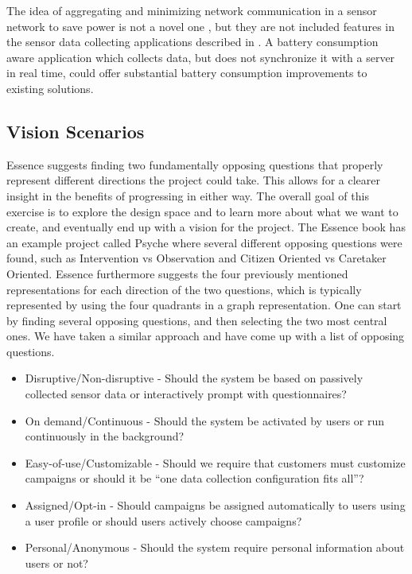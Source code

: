 The idea of aggregating and minimizing network communication in a sensor network to save power is not a novel one \parencite{korteweg2007data} \parencite{mhatre2004design}, but they are not included features in the sensor data collecting applications described in . A battery consumption aware application which collects data, but does not synchronize it with a server in real time, could offer substantial battery consumption improvements to existing solutions. 

\subsection{Vision Scenarios}
\label{sub:vision_scenarios}

Essence suggests finding two fundamentally opposing questions that properly represent different directions the project could take. This allows for a clearer insight in the benefits of progressing in either way. The overall goal of this exercise is to explore the design space and to learn more about what we want to create, and eventually end up with a vision for the project. The Essence book has an example project called Psyche where several different opposing questions were found, such as Intervention vs Observation and Citizen Oriented vs Caretaker Oriented. Essence furthermore suggests the four previously mentioned representations for each direction of the two questions, which is typically represented by using the four quadrants in a graph representation. One can start by finding several opposing questions, and then selecting the two most central ones. We have taken a similar approach and have come up with a list of opposing questions.

\begin{itemize}[itemsep=0.1em]
	\item Disruptive/Non-disruptive - Should the system be based on passively collected sensor data or interactively prompt with questionnaires? %
	\item On demand/Continuous - Should the system be activated by users or run continuously in the background? %
	\item Easy-of-use/Customizable - Should we require that customers must customize campaigns or should it be ``one data collection configuration fits all''? %
	\item Assigned/Opt-in - Should campaigns be assigned automatically to users using a user profile or should users actively choose campaigns? %
	\item Personal/Anonymous - Should the system require personal information about users or not? %
\end{itemize}

